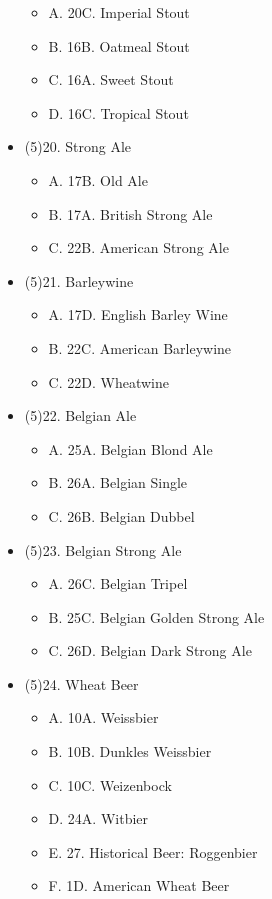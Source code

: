 \begin{multicols*}{2}
\begin{itemize}[noitemsep]
\begin{itemize}
  \item[] A. 20C. Imperial Stout
  \item[] B. 16B. Oatmeal Stout
  \item[] C. 16A. Sweet Stout
  \item[] D. 16C. Tropical Stout
\end{itemize}
\item[] (5)20. Strong Ale
\begin{itemize}
  \item[] A. 17B. Old Ale
  \item[] B. 17A. British Strong Ale
  \item[] C. 22B. American Strong Ale
\end{itemize}
\item[] (5)21. Barleywine
\begin{itemize}
  \item[] A. 17D. English Barley Wine
  \item[] B. 22C. American Barleywine
  \item[] C. 22D. Wheatwine
\end{itemize}
\item[] (5)22. Belgian Ale
\begin{itemize}
  \item[] A. 25A. Belgian Blond Ale
  \item[] B. 26A. Belgian Single
  \item[] C. 26B. Belgian Dubbel
\end{itemize}
\item[] (5)23. Belgian Strong Ale
\begin{itemize}
  \item[] A. 26C. Belgian Tripel
  \item[] B. 25C. Belgian Golden Strong Ale
  \item[] C. 26D. Belgian Dark Strong Ale
\end{itemize}
\item[] (5)24. Wheat Beer
\begin{itemize}
  \item[] A. 10A. Weissbier
  \item[] B. 10B. Dunkles Weissbier
  \item[] C. 10C. Weizenbock
  \item[] D. 24A. Witbier
  \item[] E. 27. Historical Beer: Roggenbier
  \item[] F. 1D. American Wheat Beer
\end{itemize}

\end{itemize}
\end{multicols*}
